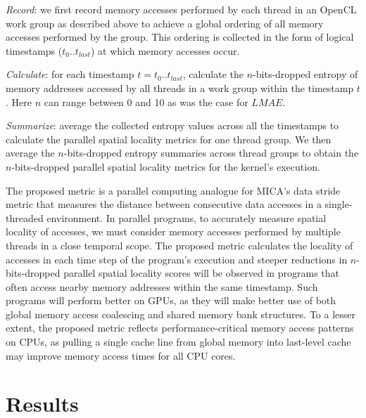 \documentclass[review=false, sigchi]{acmart}
\begin{document}
	\textit{Record}: we first record memory accesses performed by each thread in an OpenCL work group as described above to achieve a global ordering of all memory accesses performed by the group.
	This ordering is collected in the form of logical timestamps ($t_0 .. t_{last}$) at which memory accesses occur.
	
	\textit{Calculate}: for each timestamp $t = t_0 .. t_{last}$, calculate the $n$-bits-dropped entropy of memory addresses accessed by all threads in a work group within the timestamp $t$. Here $n$ can range between 0 and 10 as was the case for $LMAE$.
	
	\textit{Summarize}: average the collected entropy values across all the timestamps to calculate the parallel spatial locality metrics for one thread group. We then average the $n$-bits-dropped entropy summaries across thread groups to obtain the $n$-bits-dropped parallel spatial locality metrics for the kernel's execution.
	
	

	The proposed metric is a parallel computing analogue for MICA's data stride metric that measures the distance between consecutive data accesses in a single-threaded environment. 
	In parallel programs, to accurately measure spatial locality of accesses, we must consider memory accesses performed by multiple threads in a close temporal scope. 
	The proposed metric calculates the locality of accesses in each time step of the program's execution and steeper reductions in $n$-bits-dropped parallel spatial locality scores will be observed in programs that often access nearby memory addresses within the same timestamp.
	Such programs will perform better on GPUs, as they will make better use of both global memory access coalescing and shared memory bank structures.
	To a lesser extent, the proposed metric reflects performance-critical memory access patterns on CPUs, as pulling a single cache line from global memory into last-level cache may improve memory access times for all CPU cores.
	
	\section{Results} \label{results}
	
\end{document}

